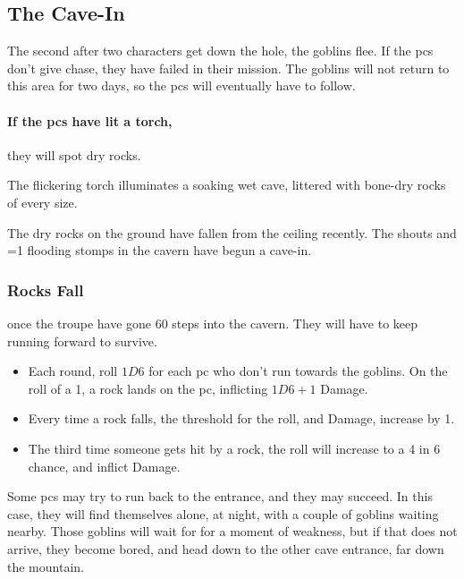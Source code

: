 \begin{multicols}{2}


\subsection{The Cave-In}

The second after two characters get down the hole, the goblins flee.
If the \glspl{pc} don't give chase, they have failed in their mission.
The goblins will not return to this area for two days, so the \glspl{pc} will eventually have to follow.

\paragraph{If the \glspl{pc} have lit a torch,}
they will spot dry rocks.

\begin{boxtext}
  The flickering torch illuminates a soaking wet cave, littered with bone-dry rocks of every size.
\end{boxtext}

The dry rocks on the ground have fallen from the ceiling recently.
The shouts and \ifnum\value{temperature}=1 flooding \else stomps \fi in the cavern have begun a cave-in.

\subsubsection{Rocks Fall}
once the troupe have gone 60 steps into the cavern.
They will have to keep running forward to survive.

\begin{itemize}
  \item
  Each round, roll $1D6$ for each \gls{pc} who don't run towards the goblins.
  On the roll of a 1, a rock lands on the \gls{pc}, inflicting $1D6+1$ Damage.
  \item
  Every time a rock falls, the threshold for the roll, and Damage, increase by 1.
  \item
    The third time someone gets hit by a rock, the roll will increase to a 4 in 6 chance, and inflict  Damage.
\end{itemize}

\caveIn

Some \glspl{pc} may try to run back to the entrance, and they may succeed.
In this case, they will find themselves alone, at night, with a couple of goblins waiting nearby.
Those goblins will wait for  for a moment of weakness, but if that does not arrive, they become bored, and head down to the other cave entrance, far down the mountain.


\end{multicols}
